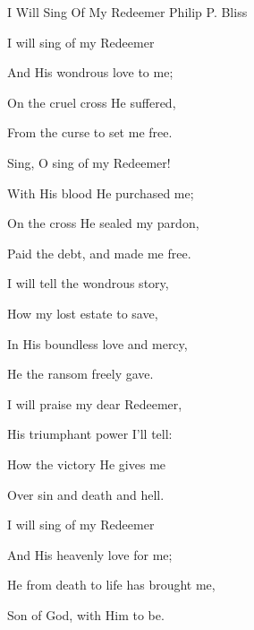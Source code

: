 \documentclass[12pt]{book}
\begin{document}
\begin{song}{I Will Sing Of My Redeemer}{}
  {\SBPubDom}
  {Philip P. Bliss}
  {}
  {}

  \begin{SBVerse}
    I will sing of my Redeemer

    And His wondrous love to me;

    On the cruel cross He suffered,

    From the curse to set me free.
  \end{SBVerse}

  \begin{SBOpGroup}
    Sing, O sing of my Redeemer!

    With His blood He purchased me;

    On the cross He sealed my pardon,

    Paid the debt, and made me free.
  \end{SBOpGroup}

  \begin{SBVerse}
    I will tell the wondrous story,

    How my lost estate to save,

    In His boundless love and mercy,

    He the ransom freely gave.
  \end{SBVerse}

  \begin{SBVerse}
    I will praise my dear Redeemer,

    His triumphant power I'll tell:

    How the victory He gives me

    Over sin and death and hell.
  \end{SBVerse}

  \begin{SBVerse}
    I will sing of my Redeemer

    And His heavenly love for me;

    He from death to life has brought me,

    Son of God, with Him to be.
  \end{SBVerse}
\end{song}
\end{document}
